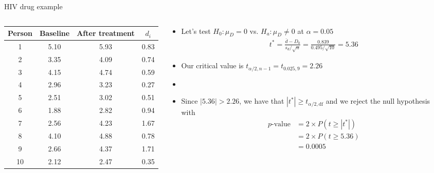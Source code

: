 \documentclass[xcolor=dvipsnames]{beamer}
\begin{document}
\begin{frame}{HIV drug example}
	\begin{columns}
		\begin{column}{.4 \textwidth}
			{\tiny
				\begin{tabular}{|c|c|c|c|}
					\hline
					\textbf{Person} & \textbf{Baseline} &  \textbf{After treatment} & $d_i$ \\ \hline \hline
					1  &    5.10 &   5.93 &  0.83 \\ \hline 
					2  &    3.35 &   4.09 &  0.74 \\ \hline 
					3  &   4.15  &  4.74 &  0.59 \\ \hline 
					4  &   2.96  &  3.23 &  0.27 \\ \hline 
					5  &    2.51 &   3.02 &  0.51 \\ \hline 
					6  &   1.88  &  2.82 &  0.94 \\ \hline 
					7  &   2.56  &  4.23 &  1.67 \\ \hline 
					8  &    4.10 &   4.88 &  0.78 \\ \hline 
					9  &   2.66  &  4.37 &  1.71 \\ \hline 
					10  &    2.12  &  2.47 &  0.35 \\ \hline 
				\end{tabular}
			}
		\end{column}
	\begin{column}{.6 \textwidth}
		\vspace{-5pt}
		\begin{itemize}
			\item Let's test $H_0: \mu_D = 0$ vs. $H_a: \mu_D \neq 0$ at $\alpha = 0.05$ \pause
			\begin{align*}
			t^* = \frac{\bar{d}-D_0}{s_d / \sqrt{n}} = \frac{0.839}{0.495 / \sqrt{10}} = 5.36
			\end{align*} \pause
			\item Our critical value is $t_{\alpha / 2, n-1} = t_{0.025, 9} = 2.26$ \pause
			\item[]
			\item Since $|5.36| > 2.26$, we have that $|t^*| \geq t_{\alpha / 2, \text{df}}$ and we reject the null hypothesis with
			\begin{align*}
				p\text{-value}&=2 \times P(t \geq |t^*|)\\ 
				&= 2 \times P(t\geq 5.36) \\
				&= 0.0005
			\end{align*} 
		\end{itemize}
	\end{column}
	\end{columns}
\end{frame}
\end{document}
